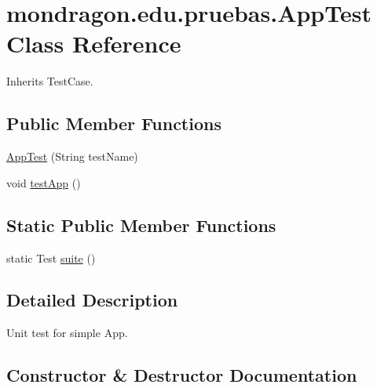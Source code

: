 \hypertarget{classmondragon_1_1edu_1_1pruebas_1_1_app_test}{}\section{mondragon.\+edu.\+pruebas.\+App\+Test Class Reference}
\label{classmondragon_1_1edu_1_1pruebas_1_1_app_test}


Inherits Test\+Case.

\subsection*{Public Member Functions}
\begin{DoxyCompactItemize}
\item 
\mbox{\hyperlink{classmondragon_1_1edu_1_1pruebas_1_1_app_test_a923f7cadc7725a4e753094081138f19f}{App\+Test}} (String test\+Name)
\item 
void \mbox{\hyperlink{classmondragon_1_1edu_1_1pruebas_1_1_app_test_a20f975819ae8283342687eb9f7c1d50c}{test\+App}} ()
\end{DoxyCompactItemize}
\subsection*{Static Public Member Functions}
\begin{DoxyCompactItemize}
\item 
static Test \mbox{\hyperlink{classmondragon_1_1edu_1_1pruebas_1_1_app_test_a74268ac7bf97d151c9f4c49293ce67d4}{suite}} ()
\end{DoxyCompactItemize}


\subsection{Detailed Description}
Unit test for simple App. 

\subsection{Constructor \& Destructor Documentation}
\mbox{\label{classmondragon_1_1edu_1_1pruebas_1_1_app_test_a923f7cadc7725a4e753094081138f19f}} 
